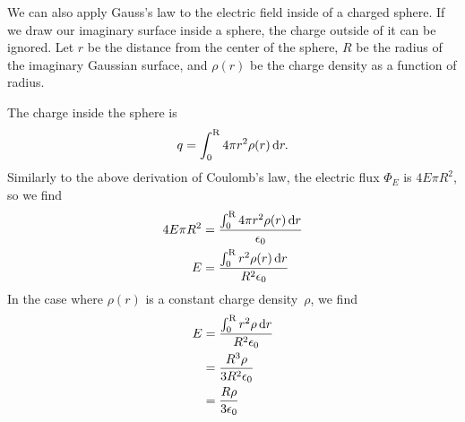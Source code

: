 We can also apply Gauss's law to the electric field inside of a charged sphere.
If we draw our imaginary surface inside a sphere,
the charge outside of it can be ignored.
Let \(r\) be the distance from the center of the sphere,
\(R\) be the radius of the imaginary Gaussian surface,
and \(\rho(r)\) be the charge density as a function of radius.

The charge inside the sphere is
\begin{equation}
    q = \int_{0}^{\mathrm{R}} 4 \pi r^2 \rho(r) \odif{r}.
\end{equation}
Similarly to the above derivation of Coulomb's law,
the electric flux \(\Phi_E\) is \(4 E \pi R^2\),
so we find
\begin{equation}
    \begin{aligned}
        4 E \pi R^2
        &= \frac{
            \int_{0}^{\mathrm{R}} 4 \pi r^2 \rho(r) \odif{r}
        }{\epsilon_0} \\
        E
        &= \frac{
            \int_{0}^{\mathrm{R}} r^2 \rho(r) \odif{r}
        }{R^2 \epsilon_0} \\
    \end{aligned}
\end{equation}
In the case where \(\rho(r)\) is a constant charge density~\(\rho\),
we find
\begin{equation}
    \begin{aligned}
        E
        &= \frac{
            \int_{0}^{\mathrm{R}} r^2 \rho \odif{r}
        }{R^2 \epsilon_0} \\
        &= \frac{
            R^3 \rho
        }{3 R^2 \epsilon_0} \\
        &= \frac{
            R \rho
        }{3 \epsilon_0} \\
    \end{aligned}
\end{equation}
